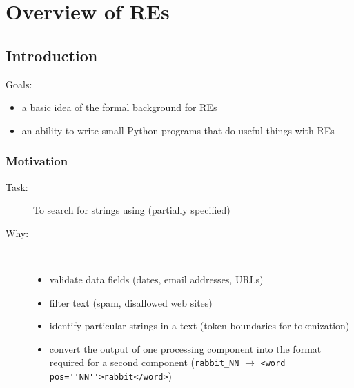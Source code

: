 \frame{\tableofcontents}







\section{Overview of REs}

\subsection{Introduction}

\begin{frame}[fragile]


Goals: 
\begin{itemize}
  \item a basic idea of the formal background for REs
  \item an ability to write small Python programs that do 
useful things with REs
\end{itemize}

\end{frame}

\begin{frame}[fragile]
  \frametitle{Motivation}

  \begin{description}
  \item [Task:] To search for strings using (partially
      specified) 
  \item [Why:]\hfill\\ 
    \begin{itemize}
    \item validate data fields (dates, email addresses, URLs)
    \item filter text (spam, disallowed web sites)
    \item identify particular strings in a text (token boundaries for tokenization)
    \item convert the output of one processing component into the format
          required for a second component  (\verb!rabbit_NN!
          $\rightarrow$ \verb!<word pos=''NN''>rabbit</word>!) 
    \end{itemize}

  \end{description}
\end{frame}


